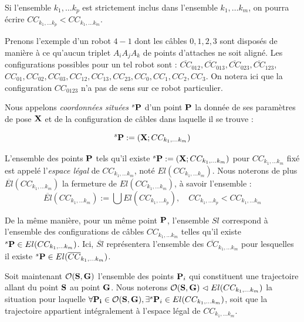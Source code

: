 Si l'ensemble $k_1, \dots k_p$ est strictement inclus dans l'ensemble $k_1,
\dots k_m$, on pourra \'ecrire $CC_{k_1, \dots k_p} < CC_{k_1, \dots
k_m}$.

Prenons l'exemple d'un robot $4-1$ dont les c\^ables $0, 1, 2, 3$ sont
dispos\'es de mani\`ere \`a ce qu'aucun triplet $A_iA_jA_k$ de points d'attaches
ne soit align\'e. Les configurations possibles pour un tel robot sont :
$\overline{CC}_{012}, \overline{CC}_{013}, \overline{CC}_{023},
\overline{CC}_{123}$, $CC_{01}, CC_{02}, CC_{03}, CC_{12}, CC_{13}, CC_{23},
CC_{0}, CC_{1}, CC_{2}, CC_{3}$. On notera ici que la configuration
${CC}_{0123}$ n'a pas de sens sur ce robot particulier.

Nous appelons {\it coordonn\'ees situ\'ees} ${}^s{\bf P}$ d'un point
${\bf P}$ la donn\'ee de ses param\`etres de pose ${\bf X}$ et de la
configuration de c\^ables dans laquelle il se trouve :

$${}^s{\bf P} := ({\bf X} ; CC_{k_1, \dots k_m})$$

L'ensemble des points $\bf P$ tels qu'il existe ${}^s {\bf P} :=
({\bf X} ; CC_{k_1, \dots k_m})$ pour $CC_{k_1, \dots k_m}$ fix\'e est appel\'e
l'{\it espace l\'egal} de $CC_{k_1, \dots k_m}$, not\'e $El(CC_{k_1, \dots
k_m})$. Nous noterons de plus $\overline{El}(CC_{k_1, \dots
k_m})$ la fermeture de ${El}(CC_{k_1, \dots k_m})$, \`a savoir l'ensemble :
$$\overline{El}(CC_{k_1, \dots k_m}) := \bigcup
El(CC_{k_1, \dots k_p}), \quad CC_{k_1, \dots k_p} < CC_{k_1, \dots k_m}$$

De la m\^eme mani\`ere, pour un m\^eme point $\bf P$, l'ensemble $Sl$
correspond \`a l'ensemble des configurations de c\^ables $CC_{k_1, \dots k_m}$
telles qu'il existe ${}^s{\bf P} \in El(CC_{k_1, \dots k_m})$. Ici,
$\overline{Sl}$ repr\'esentera l'ensemble des $\overline{CC}_{k_1, \dots k_m}$
pour lesquelles il existe ${}^s{\bf P} \in El(\overline{CC}_{k_1, \dots k_m})$.

Soit maintenant $\mathcal O({\bf S}, {\bf G})$ l'ensemble des points ${\bf
P}_i$ qui constituent une trajectoire allant du point ${\bf S}$ au point ${\bf
G}$. Nous noterons $\mathcal O({\bf S}, {\bf G}) \vartriangleleft
El(CC_{k_1, \dots k_m})$ la situation pour laquelle $\forall {\bf P_i} \in
\mathcal O({\bf S}, {\bf G}), \exists {}^s{\bf P}_i \in El(CC_{k_1, \dots
k_m})$, soit que la trajectoire appartient int\'egralement \`a l'espace l\'egal
de $CC_{k_1, \dots k_m}$.

